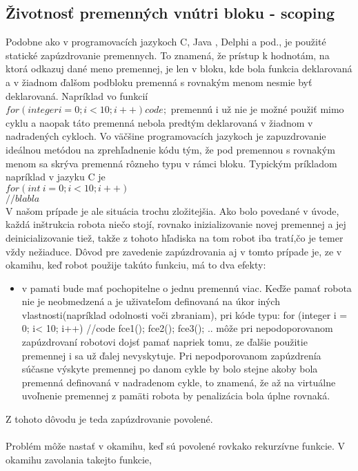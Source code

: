\subsection{Životnosť premenných vnútri bloku - scoping}
\indent Podobne ako v programovacích jazykoch C, Java , Delphi a pod., je použité statické zapúzdrovanie premennych. To znamená, že prístup k hodnotám, na ktorá odkazuj dané meno premennej, je len v bloku, kde bola funkcia deklarovaná a v žiadnom ďalšom podbloku premenná s rovnakým menom nesmie byť deklarovaná. Napríklad vo funkcií \\
$for (integer i = 0; i<10; i++)
{
	code;
}$
premennú i už nie je možné použiť mimo cyklu a naopak táto premenná nebola predtým deklarovaná v žiadnom v nadradených cykloch. Vo väčšine programovacích jazykoch je zapuzdrovanie ideálnou metódou na zprehľadnenie kódu tým, že pod premennou s rovnakým menom sa skrýva premenná rôzneho typu v rámci bloku. Typickým príkladom napríklad v jazyku C je \\$for (int\ i =0; i< 10; i++)$ \\ $ {//blabla}$ \\V našom prípade je ale situácia trochu zložitejšia. Ako bolo povedané v úvode, každá inštrukcia robota niečo stojí, rovnako inizializovanie novej premennej a jej deinicializovanie tiež, takže z tohoto hľadiska na tom robot iba tratí,čo je temer vždy nežiaduce. Dôvod pre zavedenie zapúzdrovania aj v tomto prípade je, ze v okamihu, keď robot použije takúto funkciu, má to dva efekty: \\
		\begin{itemize}
		\item v pamati bude mať pochopitelne o jednu premennú viac. Keďže pamať robota nie je neobmedzená a je uživateľom definovaná na úkor iných vlastnosti(napríklad odolnosti voči zbraniam), pri kóde typu:
for (integer i = 0; i< 10; i++)
{
	//code
}
fce1();
fce2();
fce3();
..
môže pri nepodoporovanom zapúzdrovaní robotovi dojsť pamať napriek tomu, ze ďalšie použitie premennej i sa už ďalej nevyskytuje. Pri nepodporovanom zapúzdrenía súčasne výskyte premennej po danom cykle by bolo stejne akoby bola premenná definovaná v nadradenom cykle, to znamená, že až na virtuálne uvoľnenie premennej z pamäti robota by penalizácia bola úplne rovnaká.
\end{itemize}
Z tohoto dôvodu je teda zapúzdrovanie povolené. \\
\\
Problém môže nastať v okamihu, keď sú povolené rovkako rekurzívne funkcie. V okamihu zavolania takejto funkcie, 
